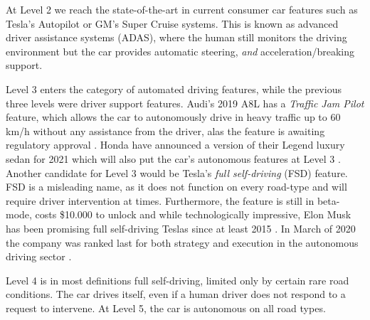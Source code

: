 \documentclass[12pt, usenames, dvipsnames]{report}
\begin{document}
\begin{flushleft}
At Level 2 we reach the state-of-the-art in current consumer car features such as Tesla's Autopilot or GM's Super Cruise systems.
This is known as advanced driver assistance systems (ADAS), where the human still monitors the driving environment but the car provides automatic steering, \emph{and} acceleration/breaking support.

Level 3 enters the category of automated driving features, while the previous three levels were driver support features.
Audi's 2019 A8L has a \emph{Traffic Jam Pilot} feature, which allows the car to autonomously drive in heavy traffic up to 60 km/h without any assistance from the driver, alas the feature is awaiting regulatory approval \cite{paukert2018}.
Honda have announced a version of their Legend luxury sedan for 2021 which will also put the car's autonomous features at Level 3 \cite{reuters2020}.
Another candidate for Level 3 would be Tesla's \emph{full self-driving} (FSD) feature.
FSD is a misleading name, as it does not function on every road-type and will require driver intervention at times.
Furthermore, the feature is still in beta-mode, costs \$10.000 to unlock and while technologically impressive, Elon Musk has been promising full self-driving Teslas since at least 2015 \cite{etherington2020} \cite{korosec2015}.
In March of 2020 the company was ranked last for both strategy and execution in the autonomous driving sector \cite{cuneo2020}.

Level 4 is in most definitions full self-driving, limited only by certain rare road conditions.
The car drives itself, even if a human driver does not respond to a request to intervene.
At Level 5, the car is autonomous on all road types.


\end{flushleft}
\end{document}
